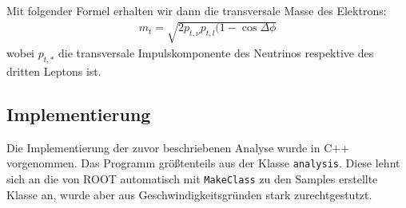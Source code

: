 Mit folgender Formel erhalten wir dann die transversale Masse des Elektrons:
\begin{align}
  m_t = \sqrt{2 p_{t,\nu} p_{t,l} (1 - \cos{\Delta\phi}}
  \label{eqn:trans}
\end{align}
wobei $p_{t,*}$ die transversale Impulskomponente des Neutrinos respektive des
dritten Leptons ist.

\subsection{Implementierung}
Die Implementierung der zuvor beschriebenen Analyse wurde in C++ vorgenommen.
Das Programm größtenteils aus der Klasse \lstinline!analysis!. Diese lehnt sich
an die von ROOT automatisch mit \lstinline!MakeClass! zu den Samples erstellte
Klasse an, wurde aber aus Geschwindigkeitsgründen stark zurechtgestutzt.

